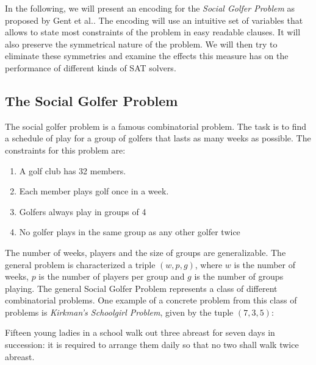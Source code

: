 \documentclass[a4paper]{scrartcl}
\begin{document}
In the following, we will present an encoding for the \emph{Social Golfer Problem} as proposed by Gent et al.\cite{Gent05}. The encoding will use an intuitive set of variables that allows to state most constraints of the problem in easy readable clauses. It will also preserve the symmetrical nature of the problem. We will then try to eliminate these symmetries and examine the effects this measure has on the performance of different kinds of SAT solvers.

\subsection{The Social Golfer Problem}

The social golfer problem is a famous combinatorial problem. The task is to find a schedule of play for a group of golfers that lasts as many weeks as possible. The constraints for this problem are:

\begin{mdframed}[skipabove=\baselineskip, skipbelow=\baselineskip, leftmargin=20, rightmargin=20]

\begin{enumerate}
    \item A golf club has 32 members.
    \item Each member plays golf once in a week.
    \item Golfers always play in groups of 4
    \item No golfer plays in the same group as any other golfer twice
\end{enumerate}

\end{mdframed}

The number of weeks, players and the size of groups are generalizable. The general problem is characterized a triple $(w,p,g)$, where $w$ is the number of weeks, $p$ is the number of players per group and $g$ is the number of groups playing. The general Social Golfer Problem represents a class of different combinatorial problems. One example of a concrete problem from this class of problems is \emph{Kirkman's Schoolgirl Problem}, given by the tuple $(7,3,5)$:

\begin{mdframed}[skipabove=\baselineskip, skipbelow=\baselineskip, leftmargin=20, rightmargin=20]

Fifteen young ladies in a school walk out three abreast for seven days in succession: it is required to arrange them daily so that no two shall walk twice abreast.

\end{mdframed}
\end{document}
